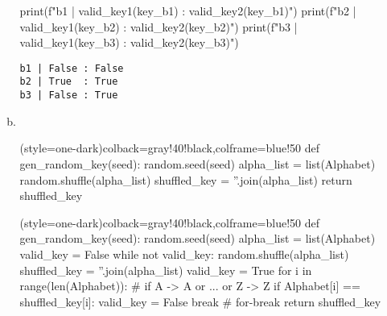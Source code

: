 \begin{enumerate}[\bf 1.]
\begin{enumerate}[(a)]
\begin{python}[]
print(f"b1 | {valid_key1(key_b1)} : {valid_key2(key_b1)}")
print(f"b2 | {valid_key1(key_b2)} : {valid_key2(key_b2)}")
print(f"b3 | {valid_key1(key_b3)} : {valid_key2(key_b3)}")
\end{python}
\begin{lstlisting}[style=terminal]
b1 | False : False
b2 | True  : True
b3 | False : True
\end{lstlisting}
	\newpage
	\item \ 
\begin{python}[](style=one-dark){colback=gray!40!black,colframe=blue!50}
def gen_random_key(seed):
	random.seed(seed)
	alpha_list = list(Alphabet)
	random.shuffle(alpha_list)
	shuffled_key = ''.join(alpha_list)
	return shuffled_key
\end{python}
\begin{python}[](style=one-dark){colback=gray!40!black,colframe=blue!50}
def gen_random_key(seed):
	random.seed(seed)
	alpha_list = list(Alphabet)
	valid_key = False
	while not valid_key:
		random.shuffle(alpha_list)
		shuffled_key = ''.join(alpha_list)
		valid_key = True
		for i in range(len(Alphabet)):
			# if A -> A or ... or Z -> Z
			if Alphabet[i] == shuffled_key[i]:
				valid_key = False
				break # for-break
		return shuffled_key
		

\end{python}
\end{enumerate}
\end{enumerate}

